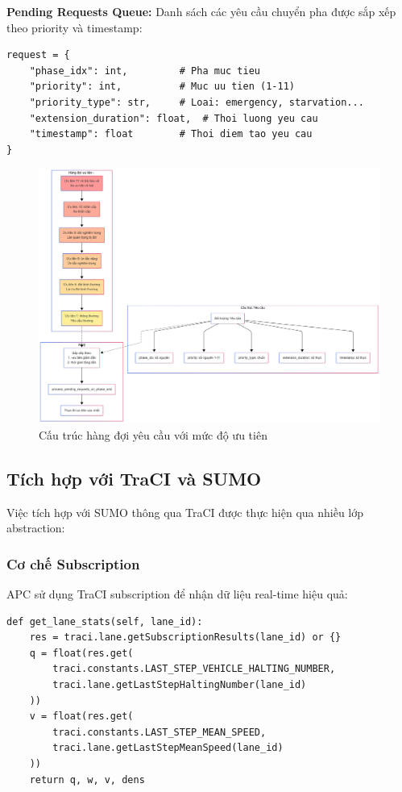 \textbf{Pending Requests Queue:} Danh sách các yêu cầu chuyển pha được sắp xếp theo priority và timestamp:
\begin{lstlisting}[style=py]
request = {
    "phase_idx": int,         # Pha muc tieu
    "priority": int,          # Muc uu tien (1-11)
    "priority_type": str,     # Loai: emergency, starvation...
    "extension_duration": float,  # Thoi luong yeu cau
    "timestamp": float        # Thoi diem tao yeu cau
}
\end{lstlisting}
\begin{figure}[H]
    \centering
    \includegraphics[width= 1.1\textwidth]{Untitled diagram _ Mermaid Chart-2025-08-22-072612.png}
    \caption{Cấu trúc hàng đợi yêu cầu với mức độ ưu tiên}
    \label{fig:priority_queue}
\end{figure}
\subsection{Tích hợp với TraCI và SUMO}

Việc tích hợp với SUMO thông qua TraCI được thực hiện qua nhiều lớp abstraction:

\subsubsection{Cơ chế Subscription}
APC sử dụng TraCI subscription để nhận dữ liệu real-time hiệu quả:

\begin{lstlisting}[style=py, caption={Xử lý subscription results}]
def get_lane_stats(self, lane_id):
    res = traci.lane.getSubscriptionResults(lane_id) or {}
    q = float(res.get(
        traci.constants.LAST_STEP_VEHICLE_HALTING_NUMBER,
        traci.lane.getLastStepHaltingNumber(lane_id)
    ))
    v = float(res.get(
        traci.constants.LAST_STEP_MEAN_SPEED,
        traci.lane.getLastStepMeanSpeed(lane_id)
    ))
    return q, w, v, dens
\end{lstlisting}

